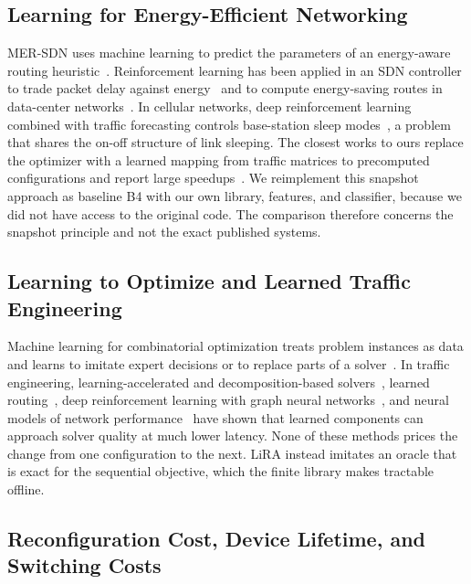 \documentclass[preprint,12pt]{elsarticle}
\begin{document}
\subsection{Learning for Energy-Efficient Networking}

MER-SDN uses machine learning to predict the parameters of an energy-aware routing heuristic~\cite{assefa2018mersdn}. Reinforcement learning has been applied in an SDN controller to trade packet delay against energy~\cite{frohlich2021rl} and to compute energy-saving routes in data-center networks~\cite{zheng2022energysaving}. In cellular networks, deep reinforcement learning combined with traffic forecasting controls base-station sleep modes~\cite{wu2021deepbsc}, a problem that shares the on-off structure of link sleeping. The closest works to ours replace the optimizer with a learned mapping from traffic matrices to precomputed configurations and report large speedups~\cite{gomezdelahiz2025noms,gomezdelahiz2026tgcn}. We reimplement this snapshot approach as baseline B4 with our own library, features, and classifier, because we did not have access to the original code. The comparison therefore concerns the snapshot principle and not the exact published systems.

\subsection{Learning to Optimize and Learned Traffic Engineering}

Machine learning for combinatorial optimization treats problem instances as data and learns to imitate expert decisions or to replace parts of a solver~\cite{bengio2021mlco}. In traffic engineering, learning-accelerated and decomposition-based solvers~\cite{xu2023teal,perry2023dote,abuzaid2021ncflow,narayanan2021pop}, learned routing~\cite{valadarsky2017learning}, deep reinforcement learning with graph neural networks~\cite{almasan2022enero,bernardez2023magnneto}, and neural models of network performance~\cite{rusek2020routenet} have shown that learned components can approach solver quality at much lower latency. None of these methods prices the change from one configuration to the next. LiRA instead imitates an oracle that is exact for the sequential objective, which the finite library makes tractable offline.

\subsection{Reconfiguration Cost, Device Lifetime, and Switching Costs}
\end{document}
